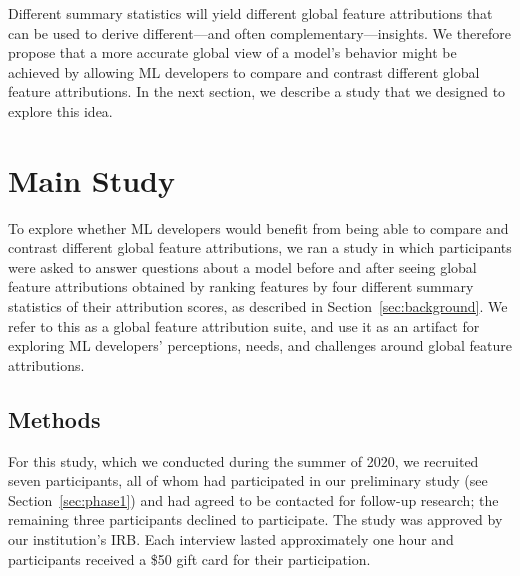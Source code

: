 \documentclass[11pt,dvipdfmx]{article}
\begin{document}
Different summary statistics will yield different global feature attributions
that can be used to derive different---and often
complementary---insights.  We therefore propose that a more accurate
global view of a model's behavior might be achieved by allowing ML
developers to compare and contrast different global feature attributions. In
the next section, we describe a study that we designed to explore this
idea.


\section{Main Study}

To explore whether ML developers would benefit from being able to
compare and contrast different global feature attributions, we ran a
study in which participants were asked to answer questions about a
model before and after seeing global feature attributions obtained by
ranking features by four different summary statistics of their
attribution scores, as described in Section~\ref{sec:background}. We
refer to this as a global feature
attribution suite, and use it as an artifact for exploring ML
developers' perceptions, needs, and challenges around global feature
attributions.

\subsection{Methods}

For this study, which we conducted during the summer of 2020, we
recruited seven participants, all of whom had participated in our
preliminary study (see Section~\ref{sec:phase1}) and had agreed to be
contacted for follow-up research; the remaining three participants
declined to participate. The study was approved by our institution's
IRB. Each interview lasted approximately one hour and participants
received a \$50 gift card for their participation.
\end{document}
